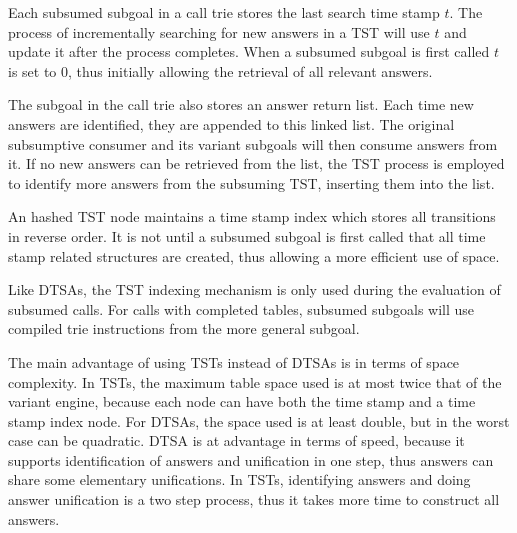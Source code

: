 Each subsumed subgoal in a call trie stores the last search time stamp $t$. The process of
incrementally searching for new answers in a TST will use $t$ and update it after the process completes.
When a subsumed subgoal is first called $t$ is set to $0$, thus initially allowing the retrieval of all
relevant answers.

The subgoal in the call trie also stores an answer return list. Each time new answers are identified, they are appended
to this linked list. The original subsumptive consumer and its variant subgoals will then consume answers from it. If no
new answers can be retrieved from the list, the TST process is employed to identify more answers from the subsuming TST,
inserting them into the list.

An hashed TST node maintains a time stamp index which stores all transitions in reverse order.
It is not until a subsumed subgoal is first called that all time stamp related structures are created, thus
allowing a more efficient use of space.

Like DTSAs, the TST indexing mechanism is only used during the evaluation of subsumed calls.
For calls with completed tables, subsumed subgoals will use compiled trie instructions from the more general subgoal.

The main advantage of using TSTs instead of DTSAs is in terms of space complexity. In TSTs, the maximum table space
used is at most twice that of the variant engine, because each node can have both the time stamp and a time stamp index node.
For DTSAs, the space used is at least double, but in the worst
case can be quadratic. DTSA is at advantage in terms of speed, because it supports identification of answers and
unification in one step, thus answers can share some elementary unifications. In TSTs, identifying answers
and doing answer unification is a two step process, thus it takes more time to construct all answers. 
